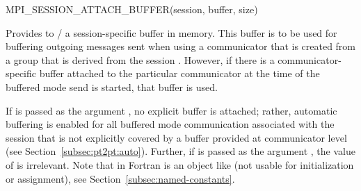 \begin{funcdef}{MPI\_SESSION\_ATTACH\_BUFFER}{(\mbox{session}, \mbox{buffer}, \mbox{size})}
\end{funcdef}

Provides to \MPI/ a session-specific buffer in memory. This buffer is to be used for buffering outgoing
messages sent when using a communicator that is created from a group that is derived from the session . However, if there is a communicator-specific buffer attached to the particular communicator at the time of the buffered mode send is started, that buffer is used.

If  is passed as the argument , no explicit buffer is attached; rather, automatic buffering is enabled for all buffered mode communication associated with the session  that is not explicitly covered by a buffer provided at communicator level (see Section~\ref{subsec:pt2pt:auto}).
Further, if  is passed as the argument , the value of  is irrelevant.
Note that in Fortran  is an
object like  (not usable for initialization or
assignment), see Section~\ref{subsec:named-constants}.

